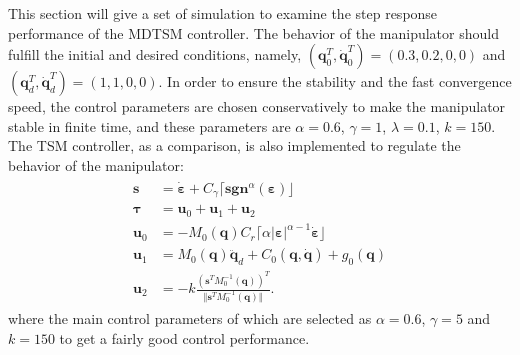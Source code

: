 \documentclass[3p]{elsarticle}
\theoremstyle{plain}
\theoremstyle{remark}
\begin{document}
This section will give a set of simulation to examine the step response performance of the MDTSM controller. The behavior of the manipulator should fulfill the initial and desired conditions, namely, $(\bm q_0^T, \dot{\bm q}_0^T)= (0.3,0.2,0,0)$ and $({\bm q}_d^T,\dot{\bm q}_d^T)=(1,1,0,0)$. In order to ensure the stability and the fast convergence speed, the control parameters are chosen conservatively to make the manipulator stable in finite time, and these parameters are $\alpha = 0.6$, $\gamma = 1$, $\lambda = 0.1$, $k = 150$. The TSM controller, as a comparison, is also implemented to regulate the behavior of the manipulator:
\begin{align}
\begin{split}
\bm s &= \dot{\bm \varepsilon}+C_\gamma\lceil\bm{sgn}^\alpha(\bm \varepsilon)\rfloor\\
\bm\tau &= \bm u_0+\bm u_1 +\bm u_2\\
\bm u_0 &= -M_0(\bm q)C_r\lceil\alpha\vert\bm\varepsilon\vert^{\alpha-1}\dot{\bm \varepsilon}\rfloor\\
\bm u_1 &= M_0(\bm q)\ddot {\bm q}_d+C_0(\bm q,\dot {\bm q})+g_0(\bm q)\\
\bm u_2 &= -k\frac{(\bm s^TM_0^{-1}(\bm q))^T}{\Vert\bm s^TM_0^{-1}(\bm q)\Vert}.
\end{split}
\end{align}
where the main control parameters of which are selected as $\alpha = 0.6$, $\gamma = 5$ and $k = 150$ to get a fairly good control performance.
\end{document}
